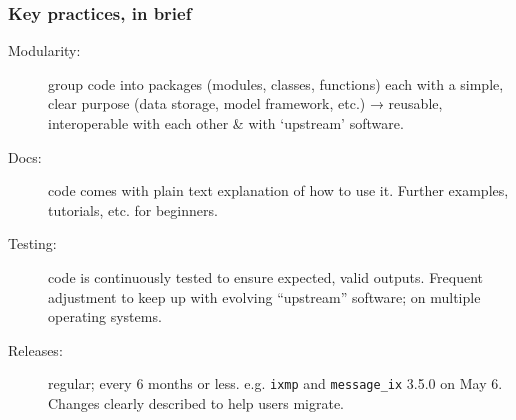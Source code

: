 \documentclass[12pt,aspectratio=169]{beamer}
\begin{document}
\begin{frame}
\frametitle{Key practices, in brief}

\begin{description}
  \item [Modularity:] group code into packages (modules, classes, functions) each with a simple, clear purpose (data storage, model framework, etc.) → reusable, interoperable with each other \& with ‘upstream’ software.
  \item [Docs:] code comes with plain text explanation of how to use it.
    Further examples, tutorials, etc. for beginners.
  \item [Testing:] code is continuously tested to ensure expected, valid outputs.
    Frequent adjustment to keep up with evolving “upstream” software; on multiple operating systems.
  \item [Releases:] regular; every 6 months or less.
    e.g. \texttt{ixmp} and \texttt{message\_ix} 3.5.0 on May 6.
    Changes clearly described to help users migrate.
\end{description}

\end{frame}
\end{document}
